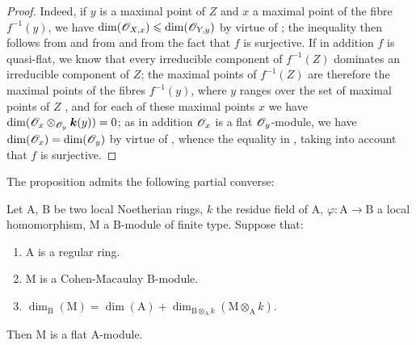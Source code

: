 \begin{proof}
Indeed, if $y$ is a maximal point of $Z$ and $x$ a maximal point of the fibre $f^{-1}(y)$, we have $\dim(\mathscr{O}_{X,x})\leqslant\dim(\mathscr{O}_{Y,y})$ by virtue of ; the inequality  then follows from  and from  and from the fact that $f$ is surjective.
If in addition $f$ is quasi-flat, we know  that every irreducible component of $f^{-1}(Z)$ dominates an irreducible component of $Z$; the maximal points of $f^{-1}(Z)$ are therefore the maximal points of the fibres $f^{-1}(y)$, where $y$ ranges over the set of maximal points of $Z$ , and for each of these maximal points $x$ we have $\dim(\mathscr{O}_x\otimes_{\mathscr{O}_y}\boldsymbol{k}(y))=0$; as in addition $\mathscr{O}_x$ is a flat $\mathscr{O}_y$-module, we have $\dim(\mathscr{O}_x)=\dim(\mathscr{O}_y)$ by virtue of , whence the equality in , taking into account that $f$ is surjective.
\end{proof}

The proposition  admits the following partial converse:

\begin{proposition}[6.1.5]
\label{IV.6.1.5}
Let $\mathrm{A}$, $\mathrm{B}$ be two local Noetherian rings, $k$ the residue field of $\mathrm{A}$, $\varphi:\mathrm{A}\to\mathrm{B}$ a local homomorphism, $\mathrm{M}$ a $\mathrm{B}$-module of finite type.
Suppose that:
\begin{enumerate}[label=\upshape\arabic{enumi}\textsuperscript{o}]
  \item $\mathrm{A}$ is a regular ring.
  \item $\mathrm{M}$ is a Cohen-Macaulay $\mathrm{B}$-module.
  \item $\dim_\mathrm{B}(\mathrm{M})=\dim(\mathrm{A})+\dim_{\mathrm{B}\otimes_\mathrm{A} k}(\mathrm{M}\otimes_\mathrm{A} k)$.
\end{enumerate}
Then $\mathrm{M}$ is a flat $\mathrm{A}$-module.
\end{proposition}

